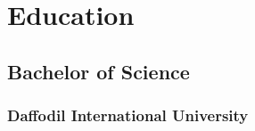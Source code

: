 \section{Education} 

\subsection{Bachelor of Science}
\subsubsection*{Daffodil International University}


\sectionspace %